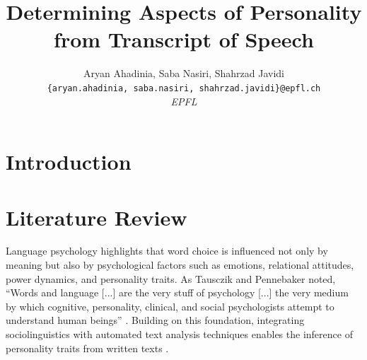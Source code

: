 \documentclass[10pt,conference,compsocconf]{IEEEtran}
\begin{document}
\title{Determining Aspects of Personality from Transcript of Speech}

\author{
  Aryan Ahadinia, Saba Nasiri, Shahrzad Javidi\\
  \texttt{\{aryan.ahadinia, saba.nasiri, shahrzad.javidi\}@epfl.ch}\\
  \textit{EPFL}
}

\maketitle

\begin{abstract}

\end{abstract}

\section{Introduction}



\section{Literature Review}\label{sec: Literature Review}

Language psychology highlights that word choice is influenced not only by meaning but also by psychological factors such as emotions, relational attitudes, power dynamics, and personality traits. As Tausczik and Pennebaker noted, “Words and language [...] are the very stuff of psychology [...] the very medium by which cognitive, personality, clinical, and social psychologists attempt to understand human beings” \cite{Tausczik2010}. Building on this foundation, integrating sociolinguistics with automated text analysis techniques enables the inference of personality traits from written texts \cite{Mairesse2007, Oberlander2006, Minamikawa2011, Gill2009, Luyckx2008}.
\end{document}
